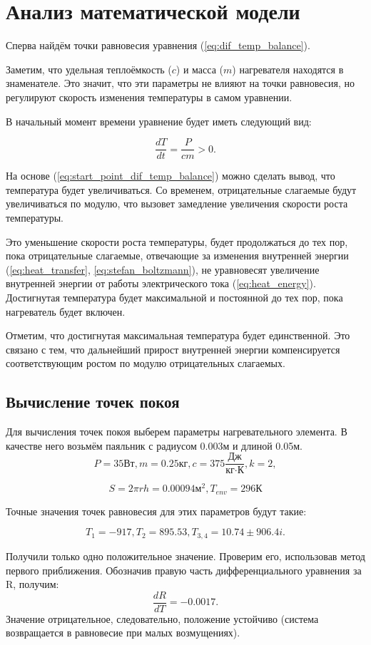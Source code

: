 \chapter{Анализ математической модели}
Сперва найдём точки равновесия уравнения (\ref{eq:dif_temp_balance}).

Заметим, что удельная теплоёмкость ($c$) и масса ($m$) нагревателя находятся в знаменателе.
Это значит, что эти параметры не влияют на точки равновесия, но регулируют скорость изменения температуры в самом уравнении.

В начальный момент времени уравнение будет иметь следующий вид:

 \begin{equation}
	\frac{dT}{dt} = \frac{P}{cm} > 0.
	\label{eq:start_point_dif_temp_balance}
\end{equation}

На основе (\ref{eq:start_point_dif_temp_balance}) можно сделать вывод, что температура будет увеличиваться. 
Со временем, отрицательные слагаемые будут увеличиваться по модулю, что вызовет замедление увеличения скорости роста температуры. 

Это уменьшение скорости роста температуры, будет продолжаться до тех пор, пока отрицательные слагаемые, отвечающие за изменения внутренней энергии (\ref{eq:heat_transfer}, \ref{eq:stefan_boltzmann}), не уравновесят увеличение внутренней энергии от работы электрического тока (\ref{eq:heat_energy}). Достигнутая температура будет максимальной и постоянной до тех пор, пока нагреватель будет включен.

Отметим, что достигнутая максимальная температура будет единственной. Это связано с тем, что дальнейший прирост внутренней энергии компенсируется соответствующим ростом по модулю отрицательных слагаемых.

\section{Вычисление точек покоя}
Для вычисления точек покоя выберем параметры нагревательного элемента.
В качестве него возьмём паяльник с радиусом 0.003м и длиной 0.05м.
\[
	P=35\text{Вт}, m = 0.25\text{кг}, c=375\frac{\text{Дж}}{\text{кг}\cdot\text{К}},k = 2,
\]

\[
	 S = 2\pi r  h = 0.00094 \text{м}^2,T_{env}= 296 \text{К}
\]

Точные значения точек равновесия для этих параметров будут такие:

 \[
T_1 = -917, T_2 = 895.53,  T_{3,4} = 10.74 \pm 906.4i.
\]

Получили только одно положительное значение. Проверим его, использовав метод первого приближения. Обозначив правую часть дифференциального уравнения за R, получим:
\begin{equation}
	\frac{dR}{dT} = - 0.0017
	\label{eq:first_check}.
\end{equation}
Значение отрицательное, следовательно, положение устойчиво (система возвращается в равновесие при малых возмущениях). 
